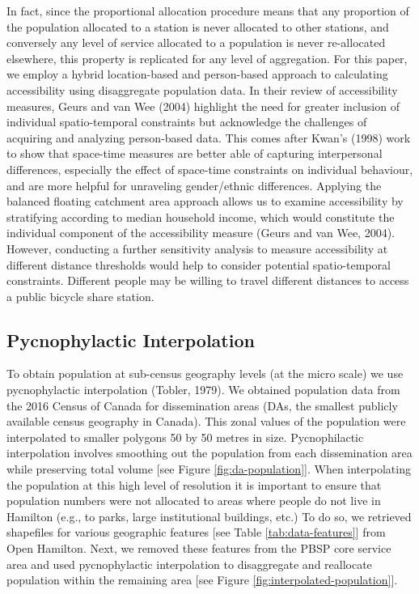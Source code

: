 \documentclass[]{elsarticle} %
\begin{document}
In fact, since the proportional allocation procedure means that any
proportion of the population allocated to a station is never allocated
to other stations, and conversely any level of service allocated to a
population is never re-allocated elsewhere, this property is replicated
for any level of aggregation. For this paper, we employ a hybrid
location-based and person-based approach to calculating accessibility
using disaggregate population data. In their review of accessibility
measures, Geurs and van Wee (2004) highlight the need for greater
inclusion of individual spatio-temporal constraints but acknowledge the
challenges of acquiring and analyzing person-based data. This comes
after Kwan's (1998) work to show that space-time measures are better
able of capturing interpersonal differences, especially the effect of
space-time constraints on individual behaviour, and are more helpful for
unraveling gender/ethnic differences. Applying the balanced floating
catchment area approach allows us to examine accessibility by
stratifying according to median household income, which would constitute
the individual component of the accessibility measure (Geurs and van
Wee, 2004). However, conducting a further sensitivity analysis to
measure accessibility at different distance thresholds would help to
consider potential spatio-temporal constraints. Different people may be
willing to travel different distances to access a public bicycle share
station.

\hypertarget{pycnophylactic-interpolation}{%
\subsection{Pycnophylactic
Interpolation}\label{pycnophylactic-interpolation}}

To obtain population at sub-census geography levels (at the micro scale)
we use pycnophylactic interpolation (Tobler, 1979). We obtained
population data from the 2016 Census of Canada for dissemination areas
(DAs, the smallest publicly available census geography in Canada). This
zonal values of the population were interpolated to smaller polygons 50
by 50 metres in size. Pycnophilactic interpolation involves smoothing
out the population from each dissemination area while preserving total
volume {[}see Figure \ref{fig:da-population}{]}. When interpolating the
population at this high level of resolution it is important to ensure
that population numbers were not allocated to areas where people do not
live in Hamilton (e.g., to parks, large institutional buildings, etc.)
To do so, we retrieved shapefiles for various geographic features {[}see
Table \ref{tab:data-features}{]} from Open Hamilton. Next, we removed
these features from the PBSP core service area and used pycnophylactic
interpolation to disaggregate and reallocate population within the
remaining area {[}see Figure \ref{fig:interpolated-population}{]}.
\end{document}
